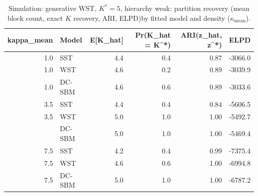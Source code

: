 \begin{table}
\centering
\caption{Simulation: generative WST, $K^*=5$, hierarchy weak: partition recovery (mean block count, exact $K$ recovery, ARI, ELPD)by fitted model and density ($\kappa_{\text{mean}}$).}
\centering
\begin{tabular}[t]{rlrrrr}
\toprule
kappa_mean & Model & E[K_hat] & Pr(K_hat = K^*) & ARI(z_hat, z^*) & ELPD\\
\midrule
1.0 & SST & 4.4 & 0.4 & 0.87 & -3066.0\\
1.0 & WST & 4.6 & 0.2 & 0.89 & -3039.9\\
1.0 & DC-SBM & 4.6 & 0.6 & 0.89 & -3033.6\\
3.5 & SST & 4.4 & 0.4 & 0.84 & -5606.5\\
3.5 & WST & 5.0 & 1.0 & 1.00 & -5492.7\\
\addlinespace
3.5 & DC-SBM & 5.0 & 1.0 & 1.00 & -5469.4\\
7.5 & SST & 4.2 & 0.4 & 0.99 & -7375.4\\
7.5 & WST & 4.6 & 0.6 & 1.00 & -6994.8\\
7.5 & DC-SBM & 5.0 & 1.0 & 1.00 & -6787.2\\
\bottomrule
\end{tabular}
\end{table}
